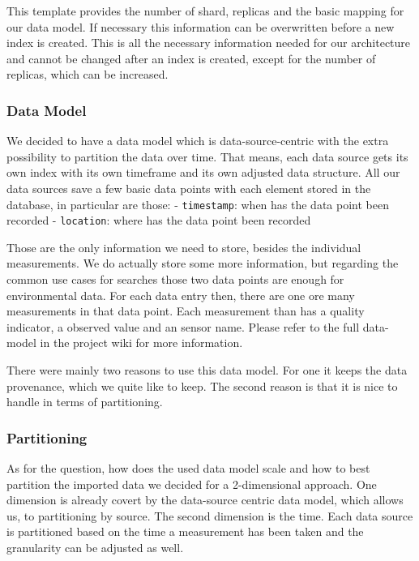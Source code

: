 This template provides the number of shard, replicas and the basic
mapping for our data model. If necessary this information can be
overwritten before a new index is created. This is all the necessary
information needed for our architecture and cannot be changed after an
index is created, except for the number of replicas, which can be
increased.

\subsubsection{Data Model}\label{data-model}

We decided to have a data model which is data-source-centric with the
extra possibility to partition the data over time. That means, each data
source gets its own index with its own timeframe and its own adjusted
data structure. All our data sources save a few basic data points with
each element stored in the database, in particular are those: -
\texttt{timestamp}: when has the data point been recorded -
\texttt{location}: where has the data point been recorded

Those are the only information we need to store, besides the individual
measurements. We do actually store some more information, but regarding
the common use cases for searches those two data points are enough for
environmental data. For each data entry then, there are one ore many
measurements in that data point. Each measurement than has a quality
indicator, a observed value and an sensor name. Please refer to the full
data-model in the project wiki for more information.

There were mainly two reasons to use this data model. For one it keeps
the data provenance, which we quite like to keep. The second reason is
that it is nice to handle in terms of partitioning.

\subsubsection{Partitioning}\label{partitioning}

As for the question, how does the used data model scale and how to best
partition the imported data we decided for a 2-dimensional approach. One
dimension is already covert by the data-source centric data model, which
allows us, to partitioning by source. The second dimension is the time.
Each data source is partitioned based on the time a measurement has been
taken and the granularity can be adjusted as well.


